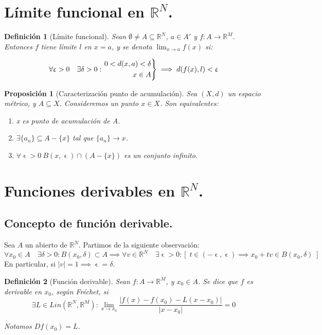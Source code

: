 \documentclass[11pt, a4paper, titlepage]{article}
\let\epsilon\upvarepsilon
\theoremstyle{theorem-style}
\newtheorem*{nprop}{Proposición}
\theoremstyle{definition-style}
\newtheorem*{ndef}{Definición}
\theoremstyle{remark-style}
\theoremstyle{example-style}
\newenvironment{nlist}
{\begin{enumerate}
\renewcommand\labelenumi{(\emph{\roman{enumi})}}}
{\end{enumerate}}
\newenvironment{rcases}
  {\left.\begin{aligned}}
  {\end{aligned}\right\rbrace}
\begin{document}
\section{Límite funcional en $\mathbb{R}^N$.}

\begin{ndef}[Límite funcional]
	Sean $\emptyset \ne A \subseteq \mathbb{R}^N$, $a\in A'$ y $f: A \longrightarrow \mathbb{R}^M$. Entonces $f$ tiene límite $l$ en $x=a$, y se denota $\displaystyle\lim_{x\to a} f(x)$ si:
	
\[
	\forall \epsilon>0\quad \exists \delta>0 : \begin{rcases}
	0<d(x,a)<\delta\\
	x\in A
\end{rcases} \implies d(f(x), l) < \epsilon
\]
\end{ndef}



\begin{nprop}[Caracterización punto de acumulación]
Sea $(X,d)$ un espacio métrico, y $A\subseteq X$. Consideremos un punto $x\in X$. Son equivalentes:

\begin{nlist}
\item x es punto de acumulación de A.
\item $\exists \{a_n\}\subseteq A-\{x\}$ tal que $\{a_n\} \rightarrow x$.
\item $\forall \epsilon > 0\ B(x,\epsilon)\cap (A-\{x\})$ es un conjunto infinito. 
\end{nlist}
\end{nprop}



\section{Funciones derivables en $\mathbb{R}^N$.}
\subsection{Concepto de función derivable.}

Sea $A$ un abierto de $\mathbb{R}^N$. Partimos de la siguiente observación:
\[
	\forall x_0 \in A\quad \exists \delta >0 : B(x_0, \delta) \subset A \implies \forall v \in \mathbb{R}^N\quad \exists \epsilon > 0 : [\; t \in (-\epsilon, \epsilon) \implies x_0+tv\in B(x_0,\delta)\;]
\]
 En particular, si $|v| = 1 \implies \epsilon = \delta$.
 
\begin{ndef}[Función derivable] Sean $f : A \longrightarrow \mathbb{R}^M$, y $x_0\in A$. Se dice que $f$ es derivable en $x_0$, según Fréchet, si
\[
	\exists L\in Lin(\mathbb{R}^N, \mathbb{R}^M) : \lim_{x\to x_0} \frac{|f(x)-f(x_0)- L(x-x_0)|}{|x-x_0|} =0
\]

Notamos $Df(x_0) = L$.
\end{ndef}
\end{document}

